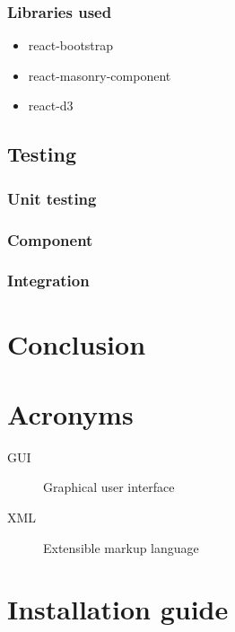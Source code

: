 \documentclass[thesis=M,english]{FITthesis}[2012/10/20]
\begin{document}
\subsection{Libraries used}


\begin{itemize}
	
	\item react-bootstrap
	\item react-masonry-component
	\item react-d3
	
\end{itemize}
\section{Testing}


\subsection{Unit testing}
\subsection{Component}
\subsection{Integration}



\chapter{Conclusion}





\appendix

\chapter{Acronyms}
\begin{description}
	\item[GUI] Graphical user interface
	\item[XML] Extensible markup language
\end{description}

\chapter{Installation guide}
\end{document}
